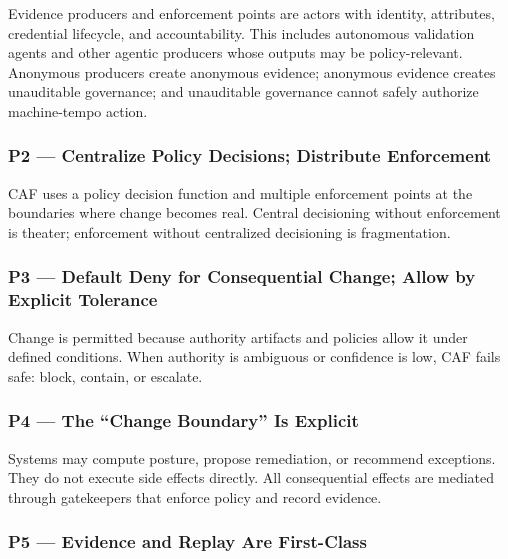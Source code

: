 \documentclass[11pt]{article}
\begin{document}
Evidence producers and enforcement points are actors with identity, attributes, credential lifecycle, and accountability. This includes autonomous validation agents and other agentic producers whose outputs may be policy-relevant. Anonymous producers create anonymous evidence; anonymous evidence creates unauditable governance; and unauditable governance cannot safely authorize machine-tempo action.

\hypertarget{p2-centralize-policy-decisions-distribute-enforcement}{%
\subsubsection{P2 --- Centralize Policy Decisions; Distribute Enforcement}\label{p2-centralize-policy-decisions-distribute-enforcement}}

CAF uses a policy decision function and multiple enforcement points at
the boundaries where change becomes real. Central decisioning without
enforcement is theater; enforcement without centralized decisioning is
fragmentation. \cite{ACPRA}

\hypertarget{p3-default-deny-for-consequential-change-allow-by-explicit-tolerance}{%
\subsubsection{P3 --- Default Deny for Consequential Change; Allow by Explicit Tolerance}\label{p3-default-deny-for-consequential-change-allow-by-explicit-tolerance}}

Change is permitted because authority artifacts and policies allow it
under defined conditions. When authority is ambiguous or confidence is
low, CAF fails safe: block, contain, or escalate.

\hypertarget{p4-the-change-boundary-is-explicit}{%
\subsubsection{P4 --- The ``Change Boundary'' Is Explicit}\label{p4-the-change-boundary-is-explicit}}

Systems may compute posture, propose remediation, or recommend
exceptions. They do not execute side effects directly. All consequential
effects are mediated through gatekeepers that enforce policy and record
evidence.

\hypertarget{p5-evidence-and-replay-are-first-class}{%
\subsubsection{P5 --- Evidence and Replay Are First-Class}\label{p5-evidence-and-replay-are-first-class}}
\end{document}
